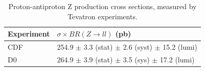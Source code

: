 \begin{table}[htbp]
  \begin{center}
    \caption{Proton-antiproton Z production cross sections, measured by Tevatron experiments.}
    \label{TableTevatron}
    \begin{tabular}[]{ | l | l | }
      \hline
      Experiment & $\sigma \times BR(Z \rightarrow ll)$ (pb) \\ \hline \hline
      CDF & 254.9 $\pm$ 3.3 (stat) $\pm$ 2.6 (syst) $\pm$ 15.2 (lumi) \\ \hline
      D0 & 264.9 $\pm$ 3.9 (stat) $\pm$ 3.5 (sys) $\pm$ 17.2 (lumi) \\ \hline
    \end{tabular}
  \end{center}
\end{table}
















